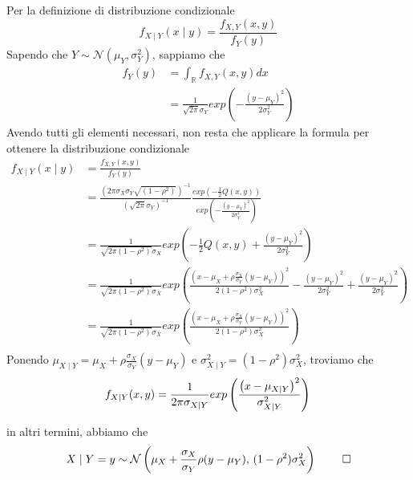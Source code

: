 \documentclass{homework}
\begin{document}
\begin{appendices}
Per la definizione di distribuzione condizionale
\[
f_{X \mid Y}(x \mid y) = \frac{f_{X, Y}(x, y)}{f_Y(y)}
\]
Sapendo che $Y \sim \mathcal{N}(\mu_Y, \sigma_Y^2)$, sappiamo che 
\[
\begin{split}
f_Y(y) &=  \int_{\mathbb{R}} f_{X, Y}(x, y) dx\\
       &= \frac{1}{\sqrt{2 \pi} \sigma_Y} exp \left(  -\frac{(y - \mu_Y)^2}{2 \sigma_Y^2} \right)
\end{split}
\]
Avendo tutti gli elementi necessari, non resta che applicare la formula per ottenere la distribuzione condizionale
\[
\begin{split}
    f_{X \mid Y}(x \mid y) &= \frac{f_{X, Y}(x, y)}{f_Y(y)}\\[2ex]
             &= \frac{\left(2\pi \sigma_X \sigma_Y \sqrt{(1 - \rho^2)} \right)^{-1}}{(\sqrt{2 \pi} \sigma_Y)^{-1}} 
             \frac{exp \left( -\frac{1}{2} Q(x, y) \right)}{exp \left(-\frac{(y - \mu_Y)^2}{2\sigma_Y^2} \right)}\\
             &= \frac{1}{\sqrt{2 \pi(1 - \rho^2)} \sigma_X} exp \left( -\frac{1}{2} Q(x, y) + \frac{(y - \mu_Y)^2}{2\sigma_Y^2} \right)\\
             &= \frac{1}{\sqrt{2 \pi (1 - \rho^2)} \sigma_X} exp \left( \frac{ \left(x - \mu_X + \rho \frac{\sigma_X}{\sigma_Y}(y - \mu_Y) \right)^2}{2(1-\rho^2)\sigma_X^2} - \frac{(y - \mu_Y)^2}{2\sigma_Y^2} + \frac{(y - \mu_Y)^2}{2\sigma_Y^2}\right)\\
             &= \frac{1}{\sqrt{2 \pi (1 - \rho^2)} \sigma_X} exp \left( \frac{ \left(x - \mu_X + \rho \frac{\sigma_X}{\sigma_Y}(y - \mu_Y) \right)^2}{2(1-\rho^2)\sigma_X^2}\right)\\
\end{split}
\]
Ponendo $\mu_{X \mid Y} = \mu_X + \rho \frac{\sigma_X}{\sigma_Y}(y - \mu_Y)$ e $\sigma^2_{X \mid Y} = (1 - \rho^2) \sigma_X^2$, troviamo che
\[
f_{X \mid Y}(x, y) = \frac{1}{2\pi \sigma_{X \mid Y}} exp \left( \frac{ \left(x - \mu_{X \mid Y} \right)^2}{\sigma_{X | Y}^2}\right)\\
\]

in altri termini, abbiamo che 
$$
X \mid Y = y \sim {\mathcal {N}}\left(\mu_{X}+{\frac {\sigma_{X}}{\sigma_{Y}}}\rho (y -\mu_{Y}),\,(1-\rho^{2})\sigma_{X}^{2}\right)\; \qed
$$

\end{appendices}

\medskip

\printbibliography
\end{document}
